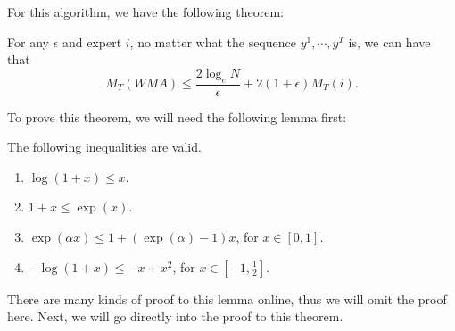 \documentclass[../main.tex]{subfiles}
\begin{document}
For this algorithm, we have the following theorem:

\begin{theorem}
	For any $\epsilon$ and expert $i$, no matter what the sequence $y^1, \cdots, y^T$ is, we can have that
	\begin{equation}
	M_T(WMA)\leq \frac{2\log_e N}{\epsilon} + 2(1+\epsilon) M_T(i).
	\end{equation}
\end{theorem}

To prove this theorem, we will need the following lemma first:

\begin{lemma}\label{inequality_lemma}
	The following inequalities are valid.
	\begin{enumerate}
		\item $\log (1+x) \leq x$.
		\item $1 + x \leq \exp(x)$.
		\item $\exp(\alpha x) \leq 1 + (\exp(\alpha) - 1) x$, for $x\in [0,1]$.
		\item $-\log (1+x) \leq -x + x^2$, for $x \in [-1, \frac{1}{2}]$.
	\end{enumerate}
\end{lemma}

There are many kinds of proof to this lemma online, thus we will omit the proof here. Next, we will go directly into the proof to this theorem.
\end{document}

